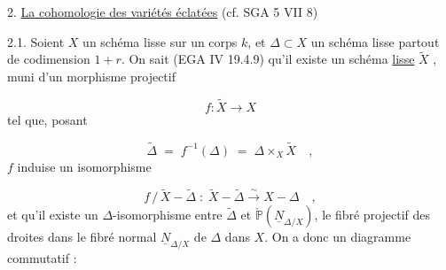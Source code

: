 2. \underline{La cohomologie des variétés éclatées} (cf. SGA 5 VII  8)

2.1. Soient $X$ un schéma lisse sur un corps $k$, et $\Delta \subset X$ un schéma lisse partout de codimension $1 + r$. On sait (EGA IV 19.4.9) qu'il existe un schéma \underline{lisse} $\widetilde{X}$ , muni d'un morphisme projectif

\begin{equation}\tag{2.1.1}
f : \widetilde{X} \longrightarrow X
\end{equation}
tel que, posant

\begin{equation}\tag{2.1.2}
\widetilde{\Delta} \;=\; f^{-1}(\Delta) \;=\; \Delta \times_X \widetilde{X} \quad ,
\end{equation}
$f$ induise un isomorphisme

\begin{equation}\tag{2.1.3}
f \,/\, \widetilde{X} - \widetilde{\Delta} \;:\; \widetilde{X} - \widetilde{\Delta} \xrightarrow{\ \sim\ } X - \Delta \quad ,
\end{equation}
et qu'il existe un $\Delta$-isomorphisme entre $\widetilde{\Delta}$ et $\check{\mathbb{P}}(\underline{N}_{\Delta/X})$, le fibré projectif
des droites dans le fibré normal $\underline{N}_{\Delta/X}$ de $\Delta$ dans $X$. On a donc un diagramme commutatif :

